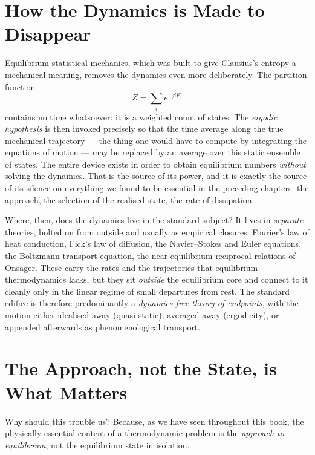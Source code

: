 \section{How the Dynamics is Made to Disappear}

Equilibrium statistical mechanics, which was built to give Clausius's entropy a
mechanical meaning, removes the dynamics even more deliberately. The partition
function
\begin{equation}
  Z = \sum_i e^{-\beta E_i}
  \label{eq:partition}
\end{equation}
contains no time whatsoever: it is a weighted count of states. The \emph{ergodic
hypothesis} is then invoked precisely so that the time average along the true
mechanical trajectory --- the thing one would have to compute by integrating the
equations of motion --- may be replaced by an average over this static ensemble of
states. The entire device exists in order to obtain equilibrium numbers
\emph{without} solving the dynamics. That is the source of its power, and it is
exactly the source of its silence on everything we found to be essential in the
preceding chapters: the approach, the selection of the realised state, the rate of
dissipation.

Where, then, does the dynamics live in the standard subject? It lives in
\emph{separate} theories, bolted on from outside and usually as empirical closures:
Fourier's law of heat conduction, Fick's law of diffusion, the Navier--Stokes and
Euler equations, the Boltzmann transport equation, the near-equilibrium reciprocal
relations of Onsager. These carry the rates and the trajectories that equilibrium
thermodynamics lacks, but they sit \emph{outside} the equilibrium core and connect
to it cleanly only in the linear regime of small departures from rest. The standard
edifice is therefore predominantly a \emph{dynamics-free theory of endpoints}, with
the motion either idealised away (quasi-static), averaged away (ergodicity), or
appended afterwards as phenomenological transport.

\section{The Approach, not the State, is What Matters}

Why should this trouble us? Because, as we have seen throughout this book, the
physically essential content of a thermodynamic problem is the \emph{approach to
equilibrium}, not the equilibrium state in isolation.

